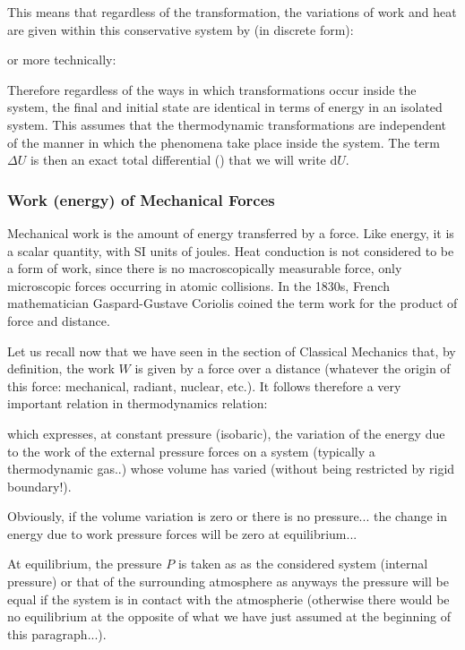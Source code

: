 	This means that regardless of the transformation, the variations of work and heat are given within this conservative system by (in discrete form):
	
	or more technically:
	
	Therefore regardless of the ways in which transformations occur inside the system, the final and initial state are identical in terms of energy in an isolated system. This assumes that the thermodynamic transformations are independent of the manner in which the phenomena take place inside the system. The term $\Delta U$ is then an exact total differential () that we will write $\mathrm{d}U$.
	
	\subsubsection{Work (energy) of Mechanical Forces}
	Mechanical work is the amount of energy transferred by a force. Like energy, it is a scalar quantity, with SI units of joules. Heat conduction is not considered to be a form of work, since there is no macroscopically measurable force, only microscopic forces occurring in atomic collisions. In the 1830s, French mathematician Gaspard-Gustave Coriolis coined the term work for the product of force and distance.
	
	Let us recall now that we have seen in the section of Classical Mechanics that, by definition, the work $W$ is given by a force over a distance (whatever the origin of this force: mechanical, radiant, nuclear, etc.). It follows therefore a very important relation in thermodynamics relation:
	
	which expresses, at constant pressure (isobaric), the variation of the energy due to the work of the external pressure forces on a system (typically a thermodynamic gas..) whose volume has varied (without being restricted by rigid boundary!).
	
	Obviously, if the volume variation is zero or there is no pressure... the change in energy due to work pressure forces will be zero at equilibrium...

	At equilibrium, the pressure $P$ is taken as as the considered system (internal pressure) or that of the surrounding atmosphere as anyways the pressure will be equal if the system is in contact with the atmospherie (otherwise there would be no equilibrium at the opposite of what we have just assumed at the beginning of this paragraph...).

